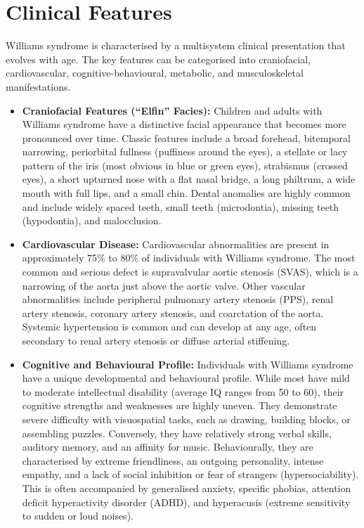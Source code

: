 \section*{Clinical Features}
Williams syndrome is characterised by a multisystem clinical presentation that evolves with age. The key features can be categorised into craniofacial, cardiovascular, cognitive-behavioural, metabolic, and musculoskeletal manifestations.
\begin{itemize}
    \item \textbf{Craniofacial Features (``Elfin'' Facies):} Children and adults with Williams syndrome have a distinctive facial appearance that becomes more pronounced over time. Classic features include a broad forehead, bitemporal narrowing, periorbital fullness (puffiness around the eyes), a stellate or lacy pattern of the iris (most obvious in blue or green eyes), strabismus (crossed eyes), a short upturned nose with a flat nasal bridge, a long philtrum, a wide mouth with full lips, and a small chin. Dental anomalies are highly common and include widely spaced teeth, small teeth (microdontia), missing teeth (hypodontia), and malocclusion.
    \item \textbf{Cardiovascular Disease:} Cardiovascular abnormalities are present in approximately 75\% to 80\% of individuals with Williams syndrome. The most common and serious defect is supravalvular aortic stenosis (SVAS), which is a narrowing of the aorta just above the aortic valve. Other vascular abnormalities include peripheral pulmonary artery stenosis (PPS), renal artery stenosis, coronary artery stenosis, and coarctation of the aorta. Systemic hypertension is common and can develop at any age, often secondary to renal artery stenosis or diffuse arterial stiffening.
    \item \textbf{Cognitive and Behavioural Profile:} Individuals with Williams syndrome have a unique developmental and behavioural profile. While most have mild to moderate intellectual disability (average IQ ranges from 50 to 60), their cognitive strengths and weaknesses are highly uneven. They demonstrate severe difficulty with visuospatial tasks, such as drawing, building blocks, or assembling puzzles. Conversely, they have relatively strong verbal skills, auditory memory, and an affinity for music. Behaviourally, they are characterised by extreme friendliness, an outgoing personality, intense empathy, and a lack of social inhibition or fear of strangers (hypersociability). This is often accompanied by generalised anxiety, specific phobias, attention deficit hyperactivity disorder (ADHD), and hyperacusis (extreme sensitivity to sudden or loud noises).

\end{itemize}
